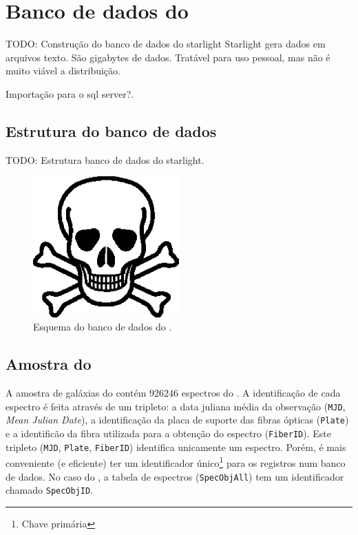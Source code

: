 \section{Banco de dados do \starlight}
TODO: Construção do banco de dados do starlight Starlight gera dados em arquivos
texto. São gigabytes de dados. Tratável para uso pessoal, mas não é muito viável
a distribuição.

Importação para o sql server?.

\subsection{Estrutura do banco de dados}
TODO: Estrutura banco de dados do starlight.

\begin{figure}
	\includegraphics[width=0.5\textwidth]{figuras/test.eps}
	\caption[Esquema do banco de dados do \starlight.]
	{Esquema do banco de dados do \starlight.}
	\label{fig:EsquemaBDStarlight}
\end{figure}

\subsection{Amostra do \starlight}
\label{sec:Crossmatch:AmostraStarlight}
A amostra de galáxias do \starlight contém $926246$ espectros do \SDSS. A
identificação de cada espectro é feita através de um tripleto: a data juliana
média da observação ({\tt MJD}, {\em Mean Julian Date}), a identificação da
placa de suporte das fibras ópticas ({\tt Plate}) e a identificão da fibra
utilizada para a obtenção do espectro ({\tt FiberID}). Este tripleto ({\tt MJD},
{\tt Plate}, {\tt FiberID}) identifica unicamente um espectro. Porém, é mais
conveniente (e eficiente) ter um identificador único{\footnote{Chave primária
\fixme}} para os registros num banco de dados. No caso do \SDSS, a tabela de
espectros ({\tt SpecObjAll}) tem um identificador chamado {\tt SpecObjID}.

